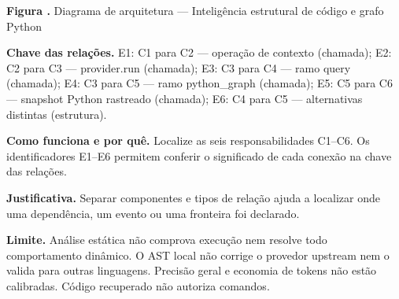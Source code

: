 {\small\textbf{Figura \thefigure.} Diagrama de arquitetura --- Inteligência estrutural de código e grafo Python}\par\smallskip
{\footnotesize\textbf{Chave das relações.} E1: C1 para C2 --- operação de contexto (chamada); E2: C2 para C3 --- provider.run (chamada); E3: C3 para C4 --- ramo query (chamada); E4: C3 para C5 --- ramo python\_graph (chamada); E5: C5 para C6 --- snapshot Python rastreado (chamada); E6: C4 para C5 --- alternativas distintas (estrutura).}\par\smallskip
\noindent\textbf{Como funciona e por quê.} Localize as seis responsabilidades C1--C6. Os identificadores E1--E6 permitem conferir o significado de cada conexão na chave das relações.\par
\noindent\textbf{Justificativa.} Separar componentes e tipos de relação ajuda a localizar onde uma dependência, um evento ou uma fronteira foi declarado.\par
\noindent\textbf{Limite.} Análise estática não comprova execução nem resolve todo comportamento dinâmico. O AST local não corrige o provedor upstream nem o valida para outras linguagens. Precisão geral e economia de tokens não estão calibradas. Código recuperado não autoriza comandos.\par\smallskip
{}
